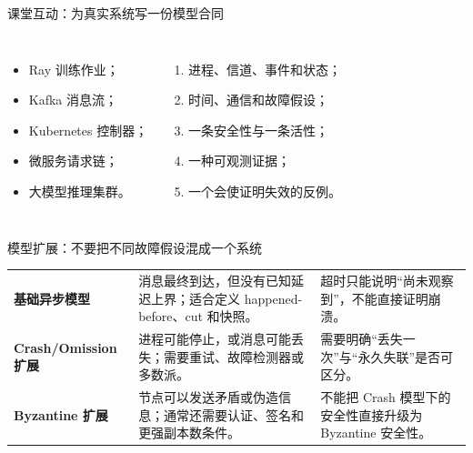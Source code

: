\documentclass[UTF8,fontset=none,aspectratio=169,10pt]{beamer}
\begin{document}
\begin{frame}{课堂互动：为真实系统写一份模型合同}
\begin{columns}[T,onlytextwidth]
\begin{itemize}
  \item Ray 训练作业；
  \item Kafka 消息流；
  \item Kubernetes 控制器；
  \item 微服务请求链；
  \item 大模型推理集群。
\end{itemize}
\begin{enumerate}
  \item 进程、信道、事件和状态；
  \item 时间、通信和故障假设；
  \item 一条安全性与一条活性；
  \item 一种可观测证据；
  \item 一个会使证明失效的反例。
\end{enumerate}
\end{columns}
\end{frame}

\begin{frame}{模型扩展：不要把不同故障假设混成一个系统}
\small
\begin{tabularx}{\linewidth}{>{\bfseries}p{3.0cm}XX}
\toprule
基础异步模型 & 消息最终到达，但没有已知延迟上界；适合定义 happened-before、cut 和快照。 & 超时只能说明“尚未观察到”，不能直接证明崩溃。 \\
Crash/Omission 扩展 & 进程可能停止，或消息可能丢失；需要重试、故障检测器或多数派。 & 需要明确“丢失一次”与“永久失联”是否可区分。 \\
Byzantine 扩展 & 节点可以发送矛盾或伪造信息；通常还需要认证、签名和更强副本数条件。 & 不能把 Crash 模型下的安全性直接升级为 Byzantine 安全性。 \\
\bottomrule
\end{tabularx}
\vfill
{}
\end{frame}

\begin{frame}[plain]
\end{frame}
\end{document}
